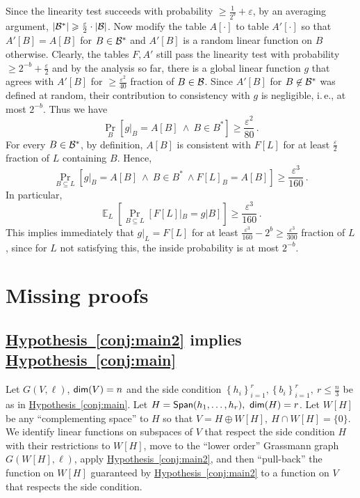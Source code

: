 \documentclass[11pt]{article}
\numberwithin{equation}{section}
\theoremstyle{definition}
\theoremstyle{plain}
\newcommand{\ie}{i.\,e.}
\newcommand{\expref}[2]{\hyperref[#2]{#1~\ref{#2}}}
\newcommand\set[1]{{\left\{ #1 \right\}}}
\newcommand\Prob[2]{{\Pr_{#1}\left[ {#2} \right]}}
\newcommand\Expect[2]{{\mathop{\mathbb{E}}_{#1}\left[ {#2} \right]}}
\newcommand\eps{\varepsilon}
\newcommand*\xor{\mathbin{\oplus}}
\renewcommand\geq{\geqslant}
\renewcommand\leq{\leqslant}
\begin{document}
Since the linearity test succeeds with probability $\geq \frac{1}{2^b} + \eps$, by an averaging argument, $|{\cal B}^*| \geq \frac{\eps}{2} \cdot |{\cal B}|$.
Now modify the table $A[\cdot]$ to table $A'[\cdot]$ so that $A'[B] = A[B]$ for $B \in {\cal B}^*$ and $A'[B]$ is a random linear function on $B$ otherwise.
Clearly, the tables $F, A'$ still pass the linearity test with probability $\geq 2^{-b} + \frac{\eps}{2}$ and by the analysis so far, there is a global linear
function $g$ that agrees with $A'[B]$ for $\geqslant \frac{\eps^2}{40}$ fraction of $B \in {\cal B}$. Since $A'[B]$ for $B \not\in {\cal B}^*$ was defined
at random, their contribution to consistency with $g$ is negligible, \ie, at most $2^{-b}$. Thus we have
 $$ \Prob{B}{ g|_B = A[B]  ~\wedge ~B \in B^*    }  \geq  \frac{\eps^2}{80}\,. $$%
For every $B \in {\cal B}^*$, by definition, $A[B]$ is consistent with $F[L]$ for at least $\frac{\eps}{2}$ fraction of $L$ containing $B$.
Hence,
   $$ \Prob{B \subseteq L}{ g|_B = A[B]  ~\wedge ~B \in B^*  ~\wedge F[L]_B = A[B]  }  \geq  \frac{\eps^3}{160}\,. $$%
In particular,
   $$ \Expect{L} {  \Prob{B \subseteq L} {  F[L]|_B = g|B   }          } \geq  \frac{\eps^3}{160}\,. $$%
This implies immediately that $g|_L = F[L]$ for at least  $ \frac{\eps^3}{160} - 2^b \geq  \frac{\eps^3}{300} $ fraction of $L$, since for $L$ not satisfying this,
the inside probability is at most $2^{-b}$.



\section{Missing proofs}
\subsection{ \expref{Hypothesis}{conj:main2} implies \expref{Hypothesis}{conj:main}}\label{appendix:hyp_side_cond}

Let $G(V,\ell)$, ${\sf dim}(V)=n$ and the side condition $\set{h_i}_{i=1}^r, \set{b_i}_{i=1}^r, ~r \leq \frac{n}{3}$ be as in \expref{Hypothesis}{conj:main}. Let
$H = {\sf Span}(h_1,\ldots,h_r), ~{\sf dim}(H)=r$. Let $W[H]$ be any ``complementing space'' to $H$ so that
 $V = H \xor W[H], \ H \cap W[H] = \{0\}$.
We identify linear
functions on subspaces of $V$ that respect the side condition $H$  with  their restrictions to $W[H]$, move to the ``lower order'' Grassmann graph $G(W[H], \ell)$,
apply \expref{Hypothesis}{conj:main2}, and then ``pull-back'' the function on $W[H]$ guaranteed by \expref{Hypothesis}{conj:main2} to a function on $V$
that respects the side condition.
\end{document}
